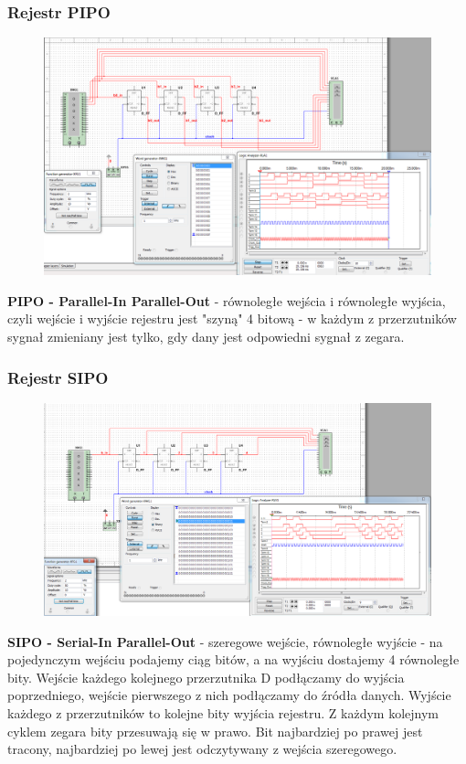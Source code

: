\documentclass[12pt,a4paper]{article}
\begin{document}
\subsubsection{Rejestr PIPO}
\begin{figure}[H]
\centering
\includegraphics[width=\textwidth]{img/3hPIPO}
\end{figure}
\textbf{PIPO - Parallel-In Parallel-Out} - równoległe wejścia i równoległe wyjścia, czyli wejście i wyjście rejestru jest "szyną" 4 bitową - w każdym z przerzutników sygnał zmieniany jest tylko, gdy dany jest odpowiedni sygnał z zegara.

\subsubsection{Rejestr SIPO}
\begin{figure}[H]
\centering
\includegraphics[width=\textwidth]{img/3hSIPO}
\end{figure}

\textbf{SIPO - Serial-In Parallel-Out} - szeregowe wejście, równoległe wyjście - na pojedynczym wejściu podajemy ciąg bitów, a na wyjściu dostajemy 4 równoległe bity. Wejście każdego kolejnego przerzutnika D podłączamy do wyjścia poprzedniego, wejście pierwszego z nich podłączamy do źródła danych. Wyjście każdego z przerzutników to kolejne bity wyjścia rejestru. Z każdym kolejnym cyklem zegara bity przesuwają się w prawo.
Bit najbardziej po prawej jest tracony, najbardziej po lewej jest odczytywany z wejścia szeregowego.
\end{document}
